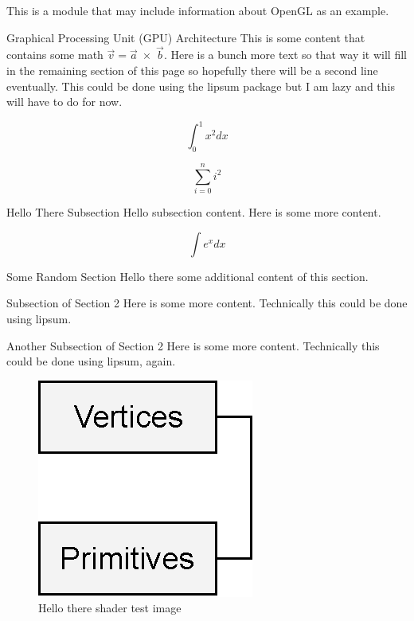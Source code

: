 \documentclass[10pt]{article}
\begin{document}


This is a module that may include information about OpenGL as an example.

\begin{section}{Graphical Processing Unit (GPU) Architecture}
This is some content that contains some math $\textstyle \vec{v} = \vec{a}\;\times\;\vec{b}$. Here is a bunch more text so that way it will fill in the remaining section of this page so hopefully there will be a second line eventually. This could be done using the lipsum package but I am lazy and this will have to do for now.

\begin{equation}
	\int_0^1 x^2 dx
\end{equation}

\begin{equation}
	\sum_{i=0}^{n}i^2
\end{equation}



\begin{subsection}{Hello There Subsection}
	Hello subsection content. Here is some more content.
	
	\begin{equation}
		\int e^x dx
	\end{equation}
\end{subsection}

\end{section}

\begin{section}{Some Random Section}
	Hello there some additional content of this section.
	
	\begin{subsection}{Subsection of Section 2}
		Here is some more content. Technically this could be done using lipsum.
	\end{subsection}
	
	\begin{subsection}{Another Subsection of Section 2}
		Here is some more content. Technically this could be done using lipsum, again.
	\end{subsection}
	
	\begin{figure}
		\includegraphics{images/ShaderTest.eps}
		\caption{Hello there shader test image}
		\label{fig:shadertest}
	\end{figure}
\end{section}
\end{document}
